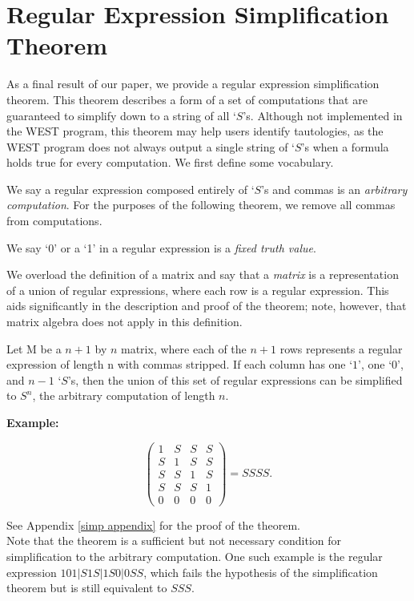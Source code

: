 \documentclass[runningheads]{llncs}
\begin{document}
\section{Regular Expression Simplification Theorem} \label{simpsection}
 As a final result of our paper, we provide a regular expression simplification theorem. This theorem describes a form of a set of computations that are guaranteed to simplify down to a string of all `$S$'s. Although not implemented in the WEST program, this theorem may help users identify tautologies, as the WEST program does not always output a single string of `$S$'s when a formula holds true for every computation. We first define some vocabulary.
\begin{definition}
We say a regular expression composed entirely of `$S$'s and commas is an \emph{arbitrary computation}. For the purposes of the following theorem, we remove all commas from computations.
\end{definition}
\begin{definition}
We say `0' or a `1' in a regular expression is a \emph{fixed truth value}.
\end{definition}
\begin{definition}
We overload the definition of a matrix and say that a \emph{matrix} is a representation of a union of regular expressions, where each row is a regular expression. This aids significantly in the description and proof of the theorem; note, however, that matrix algebra does not apply in this definition. 
\end{definition}
\begin{theorem} \label{simp}
Let M be a $n+1$ by $n$ matrix, where each of the $n+1$ rows represents a regular expression of length n with commas stripped. If each column has one `$1$', one `$0$', and $n-1$ `$S$'s, then the union of this set of regular expressions can be simplified to $S^n$, the arbitrary computation of length $n$.
\end{theorem}
\noindent \textbf{Example:}
\vspace{-0.05\textwidth}
\begin{center}
\[
    \begin{pmatrix} \label{example1}
    1 & S & S & S\\
    S & 1 & S & S\\
    S & S & 1 & S\\
    S & S & S & 1\\
    0 & 0 & 0 & 0
    \end{pmatrix} = SSSS.
\]
\end{center}
\noindent See Appendix \ref{simp appendix} for the proof of the theorem.\\
Note that the theorem is a sufficient but not necessary condition for simplification to the arbitrary computation. One such example is the regular expression $101|S1S|1S0|0SS$, which fails the hypothesis of the simplification theorem but is still equivalent to $SSS$.
\end{document}
